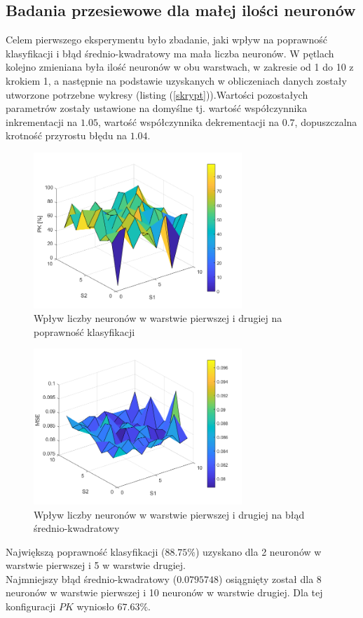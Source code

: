 \subsection{Badania przesiewowe dla małej ilości neuronów}
Celem pierwszego eksperymentu było zbadanie, jaki wpływ na poprawność klasyfikacji i błąd średnio-kwadratowy ma mała liczba neuronów. W pętlach kolejno zmieniana była ilość neuronów w obu warstwach, w zakresie od 1 do 10 z krokiem 1, a następnie na podstawie uzyskanych w obliczeniach danych zostały utworzone potrzebne wykresy (listing (\ref{skrypt})).Wartości pozostałych parametrów zostały ustawione na domyślne tj. wartość współczynnika inkrementacji na $1.05$, wartość współczynnika dekrementacji na $0.7$, dopuszczalna krotność przyrostu błędu na $1.04$.

\begin{figure}[!h]
\centering
\includegraphics[width = 0.7\textwidth]{Grafika/przesiewowe_male.png}
\caption{Wpływ liczby neuronów w warstwie pierwszej i drugiej na poprawność klasyfikacji}
\label{fig:PKeksperyment1}
\end{figure}
\begin{figure}[!h]
\centering
\includegraphics[width = 0.7\textwidth]{Grafika/mse_przesiewoweMale.png}
\caption{Wpływ liczby neuronów w warstwie pierwszej i drugiej na błąd średnio-kwadratowy}
\label{fig:MSEeksperyment1}
\end{figure}
\clearpage
Największą poprawność klasyfikacji ($88.75\%$) uzyskano dla 2 neuronów w warstwie pierwszej i 5 w warstwie drugiej.\\
Najmniejszy błąd średnio-kwadratowy ($0.0795748$) osiągnięty został dla 8 neuronów w warstwie pierwszej i 10 neuronów w warstwie drugiej. Dla tej konfiguracji $PK$ wyniosło $67.63\%$.




